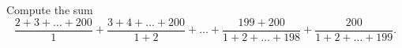 Compute the sum \[\dfrac{2+3+\ldots+200}{1}+\dfrac{3+4+\ldots+200}{1+2}+\ldots+\dfrac{199+200}{1+2+\ldots+198}+\dfrac{200}{1+2+\ldots+199}.\]
